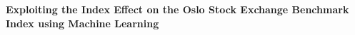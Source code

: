 \begin{center}
    {\LARGE\bfseries Exploiting the Index Effect on the Oslo Stock Exchange Benchmark Index using Machine Learning}    
\end{center}
